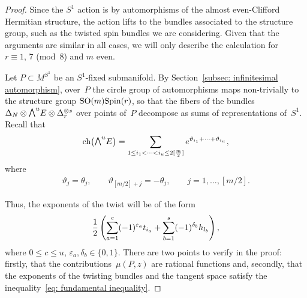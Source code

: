 \documentclass[10pt,a4paper]{amsart}
\newcommand{\ext}{\raise1pt\hbox{$\textstyle\bigwedge$}}
\newcommand{\ch}{\mbox{\rm ch}}
\numberwithin{equation}{section}
\begin{document}
\begin{proof}
Since the $S^1$ action is by automorphisms of the almost even-Clif\/ford Hermitian structure, the action lifts to the bundles associated to the structure group, such as the twisted spin bundles we are considering. Given that the arguments are similar in all cases, we will only describe the calculation for $r\equiv 1,\, 7$ (mod~8) and $m$ even.

Let $P\subset M^{S^1}$ be an $S^1$-f\/ixed submanifold. By Section~\ref{subsec: infinitesimal automorphism}, over~$P$ the circle group of automorphisms maps non-trivially to the structure group ${\rm SO}(m){\rm Spin}(r)$, so that the f\/ibers of the bundles $\Delta_N\otimes \ext^uE\otimes \Delta_r^{\otimes s}$ over points of~$P$ decompose as sums of representations of~$S^1$. Recall that
\begin{gather*}
 \ch\big(\ext^uE\big) = \sum_{1\leq i_1<\dots<i_u\leq 2[\frac{m}{2}]}e^{\vartheta_{i_1} +\dots+\vartheta_{i_u}},
\end{gather*}
where
\begin{gather*}
 \vartheta_j = \theta_j,\qquad \vartheta_{[m/2]+j} = -\theta_j,\qquad j=1,\dots,[m/2].
\end{gather*}

Thus, the exponents of the twist will be of the form
\begin{gather*}{1\over 2}\left(\sum_{a=1}^c (-1)^{\varepsilon_a}t_{i_a}+\sum_{b=1}^s (-1)^{\delta_b}h_{l_b}\right),\end{gather*}
where $0\leq c\leq u$, $\varepsilon_a,\delta_b\in \{ 0,1 \}$. There are two points to verify in the proof: f\/irstly, that the contributions~$\mu(P,z)$ are rational functions and, secondly, that the exponents of the twisting bundles and the tangent space satisfy the inequality~\eqref{eq: fundamental inequality}.


\end{proof}
\end{document}
